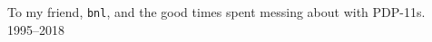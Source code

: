 \begin{dedication}

  To my friend, \texttt{bnl}, and the good times spent
  messing about with PDP-11s. \\ [2em]

  1995--2018

\end{dedication}


